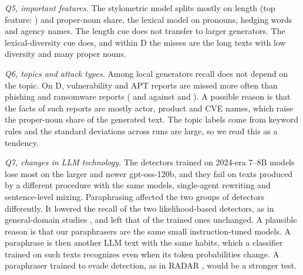 \documentclass[journal]{IEEEtran}
\begin{document}
\emph{Q5, important features.} The stylometric model splits mostly on length (top feature: \TopFeature{}) and
proper-noun share, the lexical model on pronouns, hedging words and agency names. The length cue does not transfer
to larger generators. The lexical-diversity cue does, and within D the misses are the long texts with low
diversity and many proper nouns.

\emph{Q6, topics and attack types.} Among local generators recall does not depend on the topic. On D,
vulnerability and APT reports are missed more often than phishing and ransomware reports
(\TopicDVulnerability{} and \TopicDApt{} against \TopicDPhishing{} and \TopicDRansomware{}). A possible reason is
that the facts of such reports are mostly actor, product and CVE names, which raise the proper-noun share of the
generated text. The topic labels come from keyword rules and the standard deviations across runs are large, so we
read this as a tendency.

\emph{Q7, changes in LLM technology.} The detectors trained on 2024-era 7--8B models lose most on the larger and
newer gpt-oss-120b, and they fail on texts produced by a different procedure with the same models, single-agent
rewriting and sentence-level mixing. Paraphrasing affected the two groups of detectors differently. It lowered the
recall of the two likelihood-based detectors, as in general-domain studies \cite{Krishna_2023,Sadasivan_2023}, and
left that of the trained ones unchanged. A plausible reason is that our paraphrasers are the same small
instruction-tuned models. A paraphrase is then another LLM text with the same habits, which a classifier trained on
such texts recognizes even when its token probabilities change. A paraphraser trained to evade detection, as in
RADAR \cite{Hu_2023}, would be a stronger test.
\end{document}
